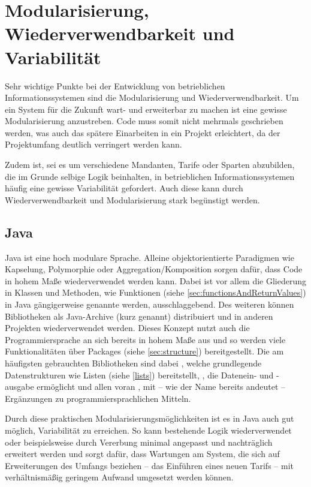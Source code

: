\section{Modularisierung, Wiederverwendbarkeit und Variabilität}\label{wiederverwendbarkeit}
Sehr wichtige Punkte bei der Entwicklung von betrieblichen Informationssystemen sind die Modularisierung und Wiederverwendbarkeit. Um ein System für die Zukunft wart- und erweiterbar zu machen ist eine gewisse Modularisierung anzustreben. Code muss somit nicht mehrmals geschrieben werden, was auch das spätere Einarbeiten in ein Projekt erleichtert, da der Projektumfang deutlich verringert werden kann. 

Zudem ist, sei es um \zB verschiedene Mandanten, Tarife oder Sparten abzubilden, die im Grunde selbige Logik beinhalten, in betrieblichen Informationssystemen häufig eine gewisse Variabilität gefordert. Auch diese kann durch Wiederverwendbarkeit und Modularisierung stark begünstigt werden.

\subsection*{Java}
Java ist eine hoch modulare Sprache. Alleine objektorientierte Paradigmen wie Kapselung, Polymorphie oder Aggregation/Komposition sorgen dafür, dass Code in hohem Maße wiederverwendet werden kann. Dabei ist vor allem die Gliederung in Klassen und Methoden, wie Funktionen (siehe \autoref{sec:functionsAndReturnValues}) in Java gängigerweise genannte werden, ausschlaggebend. Des weiteren können Bibliotheken als Java-Archive (kurz  genannt) dis­tri­bu­ie­rt und in anderen Projekten wiederverwendet werden. Dieses Konzept nutzt auch die Programmiersprache an sich bereits in hohem Maße aus und so werden viele Funktionalitäten über Packages (siehe \autoref{sec:structure}) bereitgestellt. Die am häufigsten gebrauchten Bibliotheken sind dabei , welche grundlegende Datenstrukturen wie \zB Listen (siehe \autoref{lists}) bereitstellt, , die Datenein- und -ausgabe ermöglicht und allen voran , mit -- wie der Name bereits andeutet -- Ergänzungen zu programmiersprachlichen Mitteln. 

Durch diese praktischen Modularisierungsmöglichkeiten ist es in Java auch gut möglich, Variabilität zu erreichen. So kann bestehende Logik wiederverwendet oder beispielsweise durch Vererbung minimal angepasst und nachträglich erweitert werden und sorgt dafür, dass Wartungen am System, die sich auf Erweiterungen des Umfangs beziehen -- \zB das Einführen eines neuen Tarifs -- mit verhältnismäßig geringem Aufwand umgesetzt werden können.

